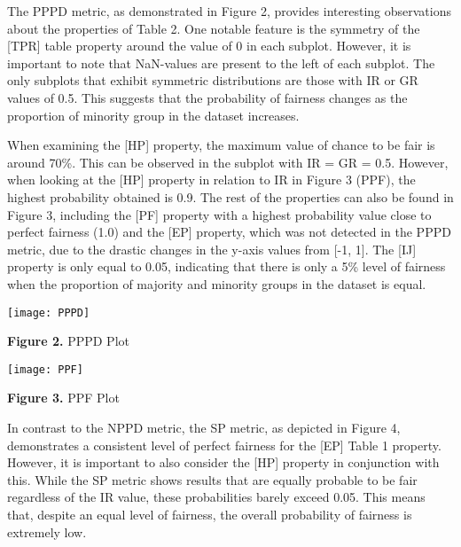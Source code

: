 \documentclass[a4paper, 12pt]{article}
\begin{document}
\bigbreak 

The PPPD metric, as demonstrated in Figure 2, provides interesting observations about the properties of Table 2. One notable feature is the symmetry of the [TPR] table property around the value of 0 in each subplot. However, it is important to note that NaN-values are present to the left of each subplot. The only subplots that exhibit symmetric distributions are those with IR or GR values of 0.5. This suggests that the probability of fairness changes as the proportion of minority group in the dataset increases.

When examining the [HP] property, the maximum value of chance to be fair is around 70\%. This can be observed in the subplot with IR = GR = 0.5. However, when looking at the [HP] property in relation to IR in Figure 3 (PPF), the highest probability obtained is 0.9. The rest of the properties can also be found in Figure 3, including the [PF] property with a highest probability value close to perfect fairness (1.0) and the [EP] property, which was not detected in the PPPD metric, due to the drastic changes in the y-axis values from [-1, 1]. The [IJ] property is only equal to 0.05, indicating that there is only a 5\% level of fairness when the proportion of majority and minority groups in the dataset is equal.
\bigbreak

\begin{flushleft}
\texttt{[image: PPPD]}
\end{flushleft}

\begin{center}

\bigbreak
\normalsize{\textbf{Figure 2.} PPPD Plot}
\end{center}
\bigbreak

\begin{flushleft}
\texttt{[image: PPF]}
\end{flushleft}

\begin{center}

\bigbreak
\normalsize{\textbf{Figure 3.} PPF Plot}
\end{center}


In contrast to the NPPD metric, the SP metric, as depicted in Figure 4, demonstrates a consistent level of perfect fairness for the [EP] Table 1 property. However, it is important to also consider the [HP] property in conjunction with this. While the SP metric shows results that are equally probable to be fair regardless of the IR value, these probabilities barely exceed 0.05. This means that, despite an equal level of fairness, the overall probability of fairness is extremely low.
\end{document}
